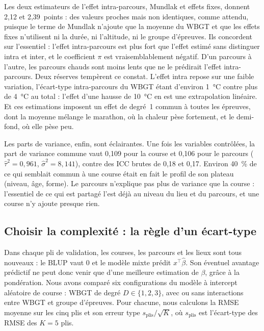\documentclass[11pt,a4paper]{article}
\begin{document}
Les deux estimateurs de l'effet intra-parcours, Mundlak et effets fixes, donnent 2,12 et 2,39~points : des valeurs
proches mais non identiques, comme attendu, puisque le terme de Mundlak n'ajoute que la moyenne du WBGT et que les
effets fixes n'utilisent ni la durée, ni l'altitude, ni le groupe d'épreuves. Ils concordent sur l'essentiel : l'effet
intra-parcours est plus fort que l'effet estimé sans distinguer intra et inter, et le coefficient $\pi$ est
vraisemblablement négatif. D'un parcours à l'autre, les parcours chauds sont moins lents que ne le prédirait l'effet
intra-parcours. Deux réserves tempèrent ce constat. L'effet intra repose sur une faible variation, l'écart-type
intra-parcours du WBGT étant d'environ 1~°C contre plus de 4~°C au total : l'effet d'une hausse de 10~°C en est une
extrapolation linéaire. Et ces estimations imposent un effet de degré~1 commun à toutes les épreuves, dont la moyenne
mélange le marathon, où la chaleur pèse fortement, et le demi-fond, où elle pèse peu.

Les parts de variance, enfin, sont éclairantes. Une fois les variables contrôlées, la part de variance commune vaut
0,109 pour la course et 0,106 pour le parcours ($\hat\tau^2 = 0{,}961$, $\hat\sigma^2 = 8{,}141$), contre des ICC brutes
de 0,18 et 0,17. Environ 40~\% de ce qui semblait commun à une course était en fait le profil de son plateau (niveau,
âge, forme). Le parcours n'explique pas plus de variance que la course : l'essentiel de ce qui est partagé l'est déjà
au niveau du lieu et du parcours, et une course n'y ajoute presque rien.

\subsection{Choisir la complexité : la règle d'un écart-type}\label{sec:cv_mixte}

Dans chaque pli de validation, les courses, les parcours et les lieux sont tous nouveaux : le BLUP vaut 0 et le
modèle mixte prédit $x^\top\hat\beta$. Son éventuel avantage prédictif ne peut donc venir que d'une meilleure
estimation de $\beta$, grâce à la pondération. Nous avons comparé six configurations du modèle à intercept aléatoire
de course : WBGT de degré $D \in \{1, 2, 3\}$, avec ou sans interactions entre WBGT et groupe d'épreuves. Pour
chacune, nous calculons la RMSE moyenne sur les cinq plis et son erreur type $s_{\text{plis}}/\sqrt{K}$, où
$s_{\text{plis}}$ est l'écart-type des RMSE des $K = 5$ plis.
\end{document}
